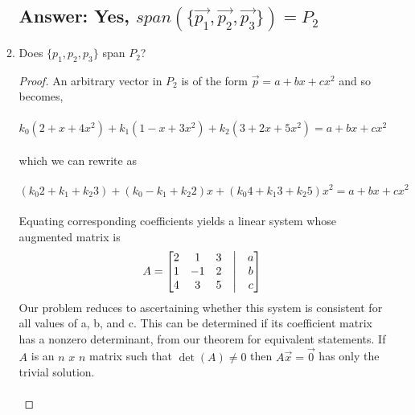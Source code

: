 \documentclass[12pt]{article}
\begin{document}
\begin{enumerate}
\begin{enumerate}
                            \subsection{Answer: Yes, $span(\{\vec{p_{1}},\vec{p_{2}},\vec{p_{3}}\}) = P_{2}$}
                      \item Does $\{p_1,p_2,p_3\}$ span $P_2$?
                            \begin{proof}
                                    An arbitrary vector in $P_{2}$ is of the form $\vec{p}=a+bx+cx^2$ and so becomes,\\\\
                                    $k_{0}(2 + x + 4x^2) +  k_{1}(1 - x + 3x^2) + k_{2}(3 + 2x + 5x^2) = a+bx+cx^2$\\\\
                                    which we can rewrite as \\\\
                                    $(k_{0}2 + k_{1} + k_{2}3) + (k_{0} - k_{1} + k_{2}2)x + (k_{0}4 + k_{1}3 + k_{2}5)x^2 = a+bx+cx^2$\\\\
                                    Equating corresponding coefficients yields a linear system whose augmented matrix is
                                    \begin{align*}
                                            A =
                                            \begin{bmatrix}
                                                    2 & 1  & 3 & \bigm| & a \\
                                                    1 & -1 & 2 & \bigm| & b \\
                                                    4 & 3  & 5 & \bigm| & c \\
                                            \end{bmatrix}
                                    \end{align*}
                                    Our problem reduces to ascertaining whether this system is consistent for
                                    all values of a, b, and c. This can be determined if its coefficient matrix
                                    has a nonzero determinant, from our theorem for equivalent statements.
                                    If $A$ is an $n$ $x$ $n$ matrix such that $\det(A)\neq0$ then $A\vec{x}=\vec{0}$ has only the trivial solution.\\\\

\end{proof}
\end{enumerate}
\end{enumerate}
\end{document}
